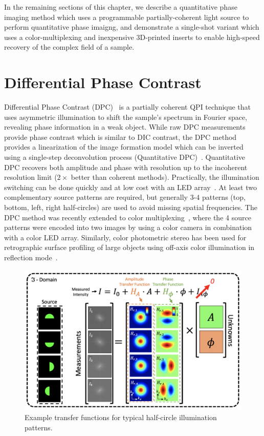 In the remaining sections of this chapter, we describe a quantitative phase imaging method which uses a programmable partially-coherent light source to perform quantitative phase imaigng, and demonstrate a single-shot variant which uses a color-multiplexing and inexpensive 3D-printed inserts to enable high-speed recovery of the complex field of a sample.

\section{Differential Phase Contrast}
Differential Phase Contrast (DPC)~\cite{Hamilton1984a,mehta2009quantitative,Tian14,tian2015quantitative} is a partially coherent QPI technique that uses asymmetric illumination to shift the sample's spectrum in Fourier space, revealing phase information in a weak object. While raw DPC measurements provide phase contrast which is similar to DIC contrast, the DPC method provides a linearization of the image formation model which can be inverted using a single-step deconvolution process (Quantitative DPC)~\cite{mehta2009quantitative,tian2015quantitative}. Quantitative DPC recovers both amplitude and phase with resolution up to the incoherent resolution limit ($2\times$ better than coherent methods). Practically, the illumination switching can be done quickly and at low cost with an LED array~\cite{Tian14,zijiMulti,tian2015quantitative}. At least two complementary source patterns are required, but generally 3-4 patterns (top, bottom, left, right half-circles) are used to avoid missing spatial frequencies. The DPC method was recently extended to color multiplexing~\cite{lee2015color}, where the 4 source patterns were encoded into two images by using a color camera in combination with a color LED array. Similarly, color photometric stereo has been used for retrographic surface profiling of large objects using off-axis color illumination in reflection mode~\cite{johnson2009retrographic}.

\begin{figure}[h]
\centering
\includegraphics[width=1\textwidth]{figures/fig_phase_dpc_transfer.png}
\caption{\label{fig:dpc_transfer} Example transfer functions for typical half-circle illumination patterns.}
\end{figure}

